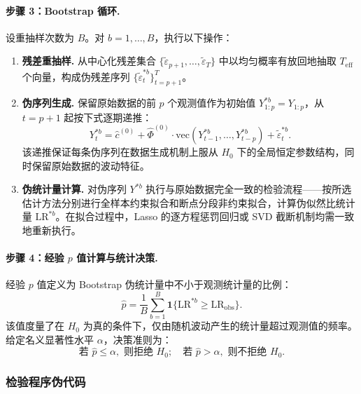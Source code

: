 \paragraph{步骤 3：Bootstrap 循环.}
设重抽样次数为 $B$。对 $b = 1, \ldots, B$，执行以下操作：

\begin{enumerate}
    \item \textbf{残差重抽样.} 从中心化残差集合 $\{\tilde{\varepsilon}_{p+1}, \ldots, \tilde{\varepsilon}_T\}$ 中以均匀概率有放回地抽取 $T_{\text{eff}}$ 个向量，构成伪残差序列 $\{\tilde{\varepsilon}_t^{*b}\}_{t=p+1}^{T}$。

    \item \textbf{伪序列生成.} 保留原始数据的前 $p$ 个观测值作为初始值 $Y_{1:p}^{*b} = Y_{1:p}$，从 $t = p+1$ 起按下式逐期递推：
    \begin{equation}\label{eq:bootstrap-recursion}
        Y_t^{*b} = \hat{c}^{(0)} + \hat{\Phi}^{(0)} \cdot \mathrm{vec}(Y_{t-1}^{*b}, \ldots, Y_{t-p}^{*b}) + \tilde{\varepsilon}_t^{*b}.
    \end{equation}
    该递推保证每条伪序列在数据生成机制上服从 $H_0$ 下的全局恒定参数结构，同时保留原始数据的波动特征。

    \item \textbf{伪统计量计算.} 对伪序列 $Y^{*b}$ 执行与原始数据完全一致的检验流程——按所选估计方法分别进行全样本约束拟合和断点分段非约束拟合，计算伪似然比统计量 $\mathrm{LR}^{*b}$。在拟合过程中，Lasso 的逐方程惩罚回归或 SVD 截断机制均需一致地重新执行。
\end{enumerate}

\paragraph{步骤 4：经验 $p$ 值计算与统计决策.}
经验 $p$ 值定义为 Bootstrap 伪统计量中不小于观测统计量的比例：
\begin{equation}\label{eq:p-value}
    \hat{p} = \frac{1}{B} \sum_{b=1}^{B} \mathbf{1}\{\mathrm{LR}^{*b} \geq \mathrm{LR}_{\text{obs}}\}.
\end{equation}
该值度量了在 $H_0$ 为真的条件下，仅由随机波动产生的统计量超过观测值的频率。给定名义显著性水平 $\alpha$，决策准则为：
\begin{equation}\label{eq:decision}
    \text{若 } \hat{p} \leq \alpha, \text{ 则拒绝 } H_0; \quad \text{若 } \hat{p} > \alpha, \text{ 则不拒绝 } H_0.
\end{equation}

\subsubsection{检验程序伪代码}

